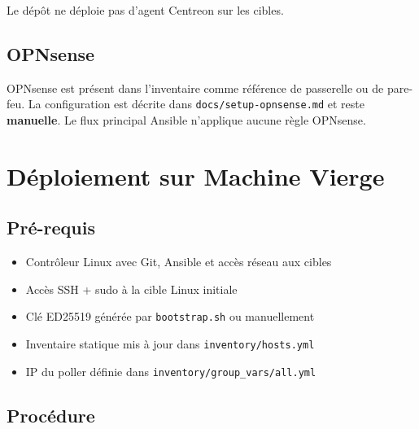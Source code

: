 \documentclass[11pt,a4paper]{article}
\begin{document}
Le dépôt ne déploie pas d'agent Centreon sur les cibles.

\subsection{OPNsense}

OPNsense est présent dans l'inventaire comme référence de passerelle ou de pare-feu. La configuration est décrite dans \texttt{docs/setup-opnsense.md} et reste \textbf{manuelle}. Le flux principal Ansible n'applique aucune règle OPNsense.

\section{Déploiement sur Machine Vierge}

\subsection{Pré-requis}

\begin{itemize}
  \item Contrôleur Linux avec Git, Ansible et accès réseau aux cibles
  \item Accès SSH + sudo à la cible Linux initiale
  \item Clé ED25519 générée par \texttt{bootstrap.sh} ou manuellement
  \item Inventaire statique mis à jour dans \texttt{inventory/hosts.yml}
  \item IP du poller définie dans \texttt{inventory/group\_vars/all.yml}
\end{itemize}

\subsection{Procédure}
\end{document}
